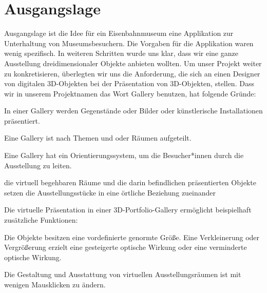 \section{Ausgangslage}
Ausgangslage ist die Idee für ein Eisenbahnmuseum eine Applikation zur Unterhaltung von Museumsbesuchern. Die Vorgaben für die Applikation waren wenig spezifisch. In weiteren Schritten wurde uns klar, dass wir eine ganze Ausstellung dreidimensionaler Objekte anbieten wollten. Um unser Projekt weiter zu konkretisieren, überlegten wir uns die Anforderung, die sich an einen Designer von digitalen 3D-Objekten bei der Präsentation von 3D-Objekten, stellen.
Dass wir in unserem Projektnamen das Wort Gallery benutzen, hat folgende Gründe:
\begin{compactitem}
    \item In einer Gallery werden Gegenstände oder Bilder oder künstlerische Installationen präsentiert.
    \item Eine Gallery ist nach Themen und oder Räumen aufgeteilt.
    \item Eine Gallery hat ein Orientierungssystem, um die Besucher*innen durch die Ausstellung zu leiten.
    \item die virtuell begehbaren Räume und die darin befindlichen präsentierten Objekte setzen die Ausstellungsstücke in eine örtliche Beziehung zueinander
\end{compactitem}


Die virtuelle Präsentation in einer 3D-Portfolio-Gallery ermöglicht beispielhaft zusätzliche Funktionen:
\begin{compactitem}
    \item Die Objekte besitzen eine vordefinierte genormte Größe. Eine Verkleinerung oder Vergrößerung erzielt eine gesteigerte optische Wirkung oder eine verminderte optische Wirkung.
    \item Die Gestaltung und Ausstattung von virtuellen Ausstellungsräumen ist mit wenigen Mausklicken zu ändern.
\end{compactitem}


